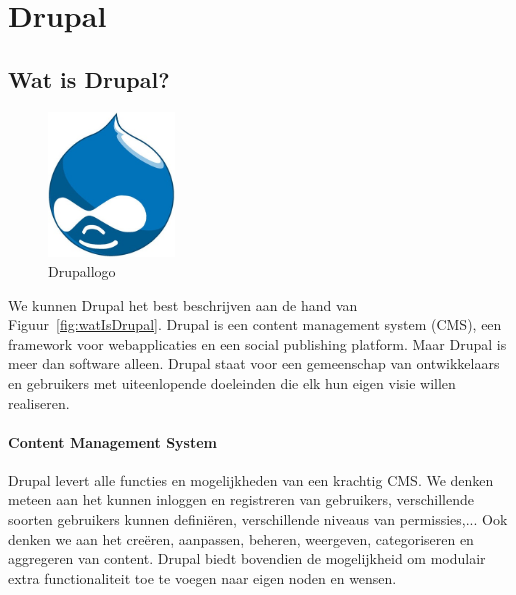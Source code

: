 \chapter{Drupal}

\section{Wat is Drupal?}

\begin{figure}
\vspace{-40pt}
\centering
\label{fig:drupalLogo}
\includegraphics[width=0.3\textwidth]{fig/drupalLogo}
\vspace{-30pt}
\centering
\caption{Drupallogo}
\centering
\vspace{-40pt}
\end{figure}
We kunnen Drupal het best beschrijven aan de hand van Figuur~\ref{fig:watIsDrupal}.
Drupal is een content management system (CMS), een framework voor webapplicaties en een social publishing platform. Maar Drupal is meer dan software alleen. Drupal staat voor een gemeenschap van ontwikkelaars en gebruikers met uiteenlopende doeleinden die elk hun eigen visie willen realiseren. \cite{drupalDefGuide}

\subsubsection{Content Management System}

Drupal levert alle functies en mogelijkheden van een krachtig CMS. We denken meteen aan het kunnen inloggen en registreren van gebruikers, verschillende soorten gebruikers kunnen defini\"{e}ren, verschillende niveaus van permissies,... Ook denken we aan het cre\"{e}ren, aanpassen, beheren, weergeven, categoriseren en aggregeren van content. Drupal biedt bovendien de mogelijkheid om modulair extra functionaliteit toe te voegen naar eigen noden en wensen.

